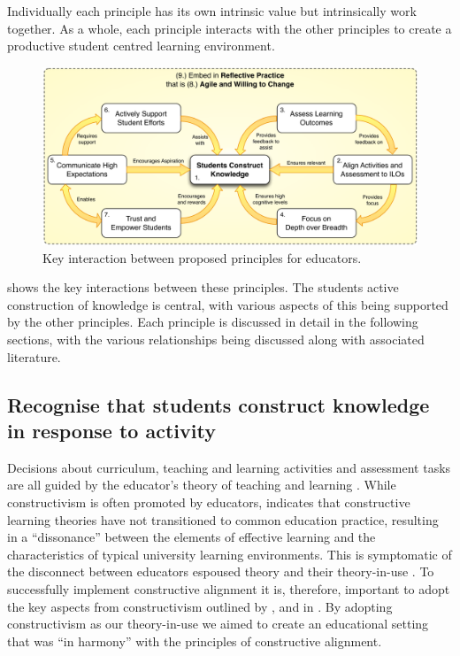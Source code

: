 Individually each principle has its own intrinsic value but intrinsically work together. As a whole, each principle interacts with the other principles to create a productive student centred learning environment.

\begin{figure}[htbp]
	\centering
	\includegraphics[width=\textwidth]{HowPrinciples}
	\caption{Key interaction between proposed principles for educators.}
	\label{fig:how_principles}
\end{figure}

 shows the key interactions between these principles. The students active construction of knowledge is central, with various aspects of this being supported by the other principles. Each principle is discussed in detail in the following sections, with the various relationships being discussed along with associated literature.

\bigskip
\subsection{Recognise that students construct knowledge in response to activity} %
\label{ssub:ideas_adopted_from_constructivism}

Decisions about curriculum, teaching and learning activities and assessment tasks are all guided by the educator's theory of teaching and learning \cite{Argyris:1976,Ramsden:1992}. While constructivism is often promoted by educators, \citet{Phillips:2005} indicates that constructive learning theories have not transitioned to common education practice, resulting in a ``dissonance'' between the elements of effective learning and the characteristics of typical university learning environments. This is symptomatic of the disconnect between educators espoused theory and their theory-in-use \cite{Argyris:1976}. To successfully implement constructive alignment it is, therefore, important to adopt the key aspects from constructivism outlined by \citet{Biggs:1996c}, \citet{Biggs:1997} and in \citet{Biggs:2007}. By adopting constructivism as our theory-in-use we aimed to create an educational setting that was ``in harmony'' with the principles of constructive alignment.

